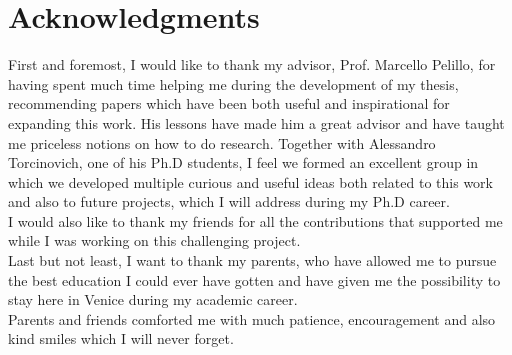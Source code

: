 





	\maketitle
	\pagestyle{plain}
	
	\chapter*{Acknowledgments}
	First and foremost, I would like to thank my advisor, Prof. Marcello Pelillo, for having spent much time helping me during the development of my thesis, recommending papers which have been both useful and inspirational for expanding this work. His lessons have made him a great advisor and have taught me priceless notions on how to do research. Together with Alessandro Torcinovich, one of his Ph.D students, I feel we formed an excellent group in which we developed multiple curious and useful ideas both related to this work and also to future projects, which I will address during my Ph.D career. \\
	I would also like to thank my friends for all the contributions that supported me while I was working on this challenging project. \\
	Last but not least, I want to thank my parents, who have allowed me to pursue the best education I could ever have gotten and have given me the possibility to stay here in Venice during my academic career. \\
	Parents and friends comforted me with much patience, encouragement and also kind smiles which I will never forget.

